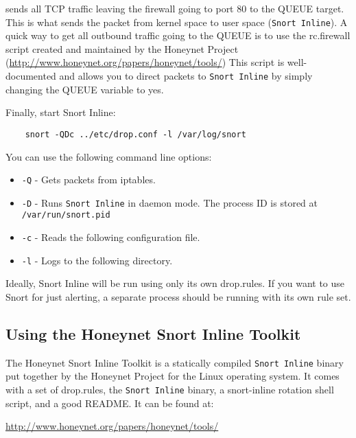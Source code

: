 \documentclass[english]{report}
\begin{document}
sends all TCP traffic leaving the firewall going to port 80 to the QUEUE
target.  This is what sends the packet from kernel space to user space
(\texttt{Snort Inline}).  A quick way to get all outbound traffic going to the
QUEUE is to use the rc.firewall script created and maintained by the Honeynet
Project (\url{http://www.honeynet.org/papers/honeynet/tools/}) This script is
well-documented and allows you to direct packets to \texttt{Snort Inline} by
simply changing the QUEUE variable to yes.

Finally, start Snort Inline:

\begin{verbatim}
    snort -QDc ../etc/drop.conf -l /var/log/snort
\end{verbatim}

You can use the following command line options:

\begin{itemize}

\item \texttt{-Q} - Gets packets from iptables.

\item \texttt{-D} - Runs \texttt{Snort Inline} in daemon mode.  The process ID
is stored at \texttt{/var/run/snort.pid}

\item \texttt{-c} - Reads the following configuration file.

\item \texttt{-l} - Logs to the following directory.

\end{itemize}

Ideally, Snort Inline will be run using only its own drop.rules.  If you want
to use Snort for just alerting, a separate process should be running with its
own rule set.

\subsection{Using the Honeynet Snort Inline Toolkit}

The Honeynet Snort Inline Toolkit is a statically compiled \texttt{Snort
Inline} binary put together by the Honeynet Project for the Linux operating
system.  It comes with a set of drop.rules, the \texttt{Snort Inline} binary, a
snort-inline rotation shell script, and a good README.  It can be found at:

\url{http://www.honeynet.org/papers/honeynet/tools/}
\end{document}
